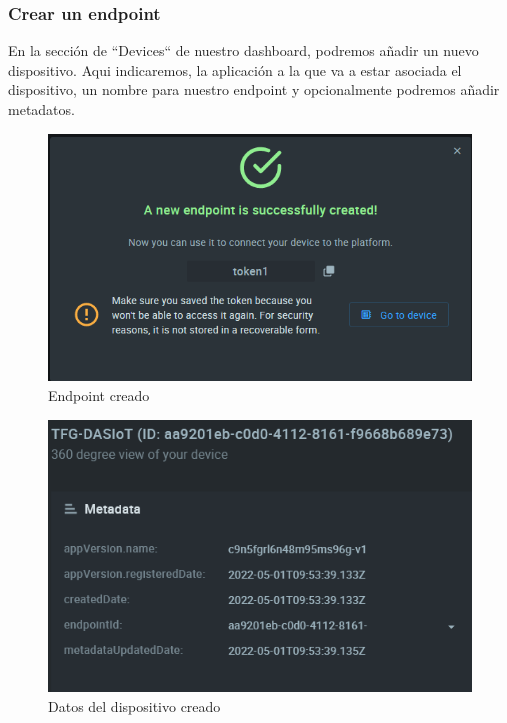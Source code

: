 {\subsubsection{Crear un endpoint}

En la sección de ``Devices`` de nuestro dashboard, podremos añadir un nuevo dispositivo. Aqui indicaremos, la aplicación a la que va a estar asociada el dispositivo, un nombre para nuestro endpoint y opcionalmente podremos añadir metadatos.

\begin{figure}[p]
    \centering
    \includegraphics[width=\linewidth]{imagenes/device-added.png}
    \caption{Endpoint creado}
    \label{fig:figure8}
\end{figure}

\begin{figure}[p]
    \centering
    \includegraphics[width=\linewidth]{imagenes/device-created-view.png}
    \caption{Datos del dispositivo creado}
    \label{fig:figure9}
\end{figure}

}
